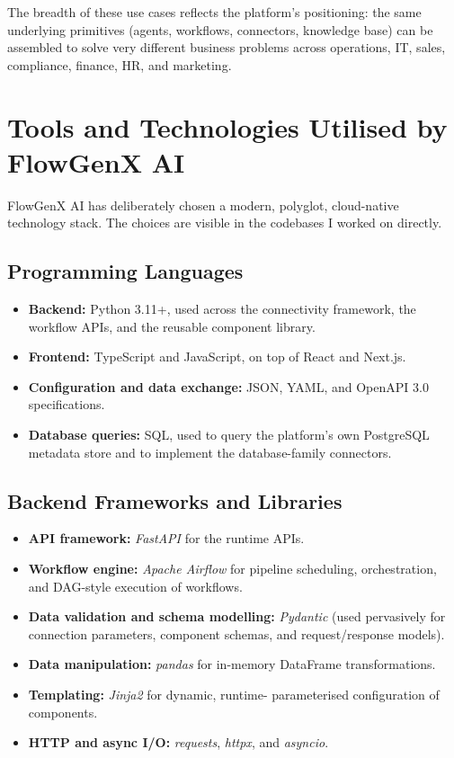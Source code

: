 The breadth of these use cases reflects the platform's positioning:
the same underlying primitives (agents, workflows, connectors,
knowledge base) can be assembled to solve very different business
problems across operations, IT, sales, compliance, finance, HR, and
marketing.

\section{Tools and Technologies Utilised by FlowGenX AI}
FlowGenX AI has deliberately chosen a modern, polyglot, cloud-native
technology stack. The choices are visible in the codebases I worked
on directly.

\subsection{Programming Languages}
\begin{itemize}[leftmargin=*]
    \item \textbf{Backend:} Python 3.11+, used across the connectivity
    framework, the workflow APIs, and the reusable component library.
    \item \textbf{Frontend:} TypeScript and JavaScript, on top of
    React and Next.js.
    \item \textbf{Configuration and data exchange:} JSON, YAML, and
    OpenAPI 3.0 specifications.
    \item \textbf{Database queries:} SQL, used to query the platform's
    own PostgreSQL metadata store and to implement the database-family
    connectors.
\end{itemize}

\subsection{Backend Frameworks and Libraries}
\begin{itemize}[leftmargin=*]
    \item \textbf{API framework:} \emph{FastAPI} for the runtime APIs.
    \item \textbf{Workflow engine:} \emph{Apache Airflow} for
    pipeline scheduling, orchestration, and DAG-style execution of
    workflows.
    \item \textbf{Data validation and schema modelling:}
    \emph{Pydantic} (used pervasively for connection parameters,
    component schemas, and request/response models).
    \item \textbf{Data manipulation:} \emph{pandas} for in-memory
    DataFrame transformations.
    \item \textbf{Templating:} \emph{Jinja2} for dynamic, runtime-
    parameterised configuration of components.
    \item \textbf{HTTP and async I/O:} \emph{requests}, \emph{httpx},
    and \emph{asyncio}.
\end{itemize}

